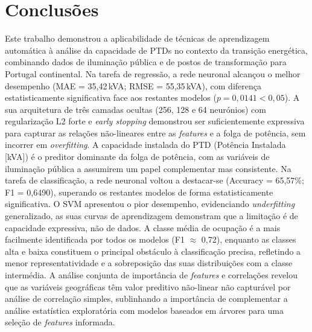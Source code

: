 \documentclass[conference]{IEEEtran}
\begin{document}
\section{Conclusões}

Este trabalho demonstrou a aplicabilidade de técnicas de aprendizagem automática à análise da capacidade de PTDs no contexto da transição energética, combinando dados de iluminação pública e de postos de transformação para Portugal continental. Na tarefa de regressão, a rede neuronal alcançou o melhor desempenho (MAE = 35,42\,kVA; RMSE = 55,35\,kVA), com diferença estatisticamente significativa face aos restantes modelos ($p = 0{,}0141 < 0{,}05$). A sua arquitetura de três camadas ocultas (256, 128 e 64 neurónios) com regularização L2 forte e \textit{early stopping} demonstrou ser suficientemente expressiva para capturar as relações não-lineares entre as \textit{features} e a folga de potência, sem incorrer em \textit{overfitting}. A capacidade instalada do PTD (Potência Instalada [kVA]) é o preditor dominante da folga de potência, com as variáveis de iluminação pública a assumirem um papel complementar mas consistente. Na tarefa de classificação, a rede neuronal voltou a destacar-se (Accuracy = 65,57\%; F1 = 0,6490), superando os restantes modelos de forma estatisticamente significativa. O SVM apresentou o pior desempenho, evidenciando \textit{underfitting} generalizado, as suas curvas de aprendizagem demonstram que a limitação é de capacidade expressiva, não de dados. A classe média de ocupação é a mais facilmente identificada por todos os modelos (F1 $\approx$ 0,72), enquanto as classes alta e baixa constituem o principal obstáculo à classificação precisa, refletindo a menor representatividade e a sobreposição das suas distribuições com a classe intermédia. A análise conjunta de importância de \textit{features} e correlações revelou que as variáveis geográficas têm valor preditivo não-linear não capturável por análise de correlação simples, sublinhando a importância de complementar a análise estatística exploratória com modelos baseados em árvores para uma seleção de \textit{features} informada.
\end{document}
